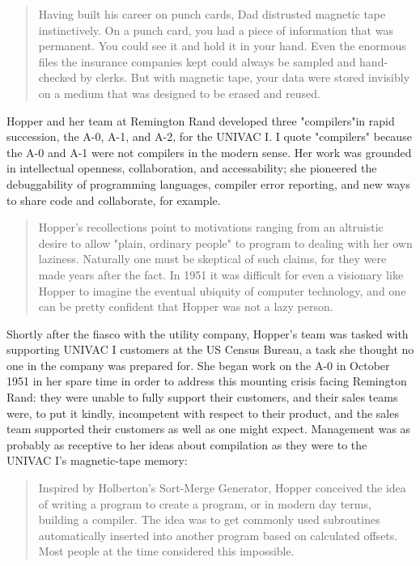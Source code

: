 \begin{quotation}
	Having built his career on punch cards, Dad distrusted magnetic
	tape instinctively. On a punch card, you had a piece of information that
	was permanent. You could see it and hold it in your hand. Even the enormous files
	the insurance companies kept could always be sampled and hand-checked
	by clerks. But with magnetic tape, your data were stored invisibly on a
	medium that was designed to be erased and
	reused.\cite{grace_hopper_and_the_invention_of_the_information_age_2009}
\end{quotation}
Hopper and her team at Remington Rand developed three "compilers"in rapid
succession, the A-0, A-1, and A-2, for the UNIVAC I. I quote "compilers" because
the A-0 and A-1 were not compilers in the modern sense. Her work was grounded in
intellectual openness, collaboration, and accessability; she pioneered the
debuggability of programming languages, compiler error reporting, and new ways
to share code and collaborate, for example.
\begin{quotation}
	Hopper's recollections point to motivations ranging from an altruistic
	desire to allow "plain, ordinary people" to program to dealing with her own
	laziness. Naturally one must be skeptical of such claims, for they were made
	years after the fact. In 1951 it was difficult for even a visionary like Hopper
	to imagine the eventual ubiquity of computer technology, and one can be pretty
	confident that Hopper was not a lazy person.
	\cite{grace_hopper_and_the_invention_of_the_information_age_2009}
\end{quotation}
Shortly after the fiasco with the utility company, Hopper's team was tasked
with supporting UNIVAC I customers at the US Census Bureau, a task she thought
no one in the company was prepared for. She began work on the A-0 in October
1951 in her spare time in order to address this mounting crisis facing
Remington Rand: they were unable to fully support their customers, and their
sales teams were, to put it kindly, incompetent with respect to their product,
and the sales team supported their customers as well as one might expect.
Management was as probably as receptive to her ideas about compilation as they
were to the UNIVAC I's magnetic-tape memory:

\begin{quotation}
	Inspired by Holberton's Sort-Merge Generator, Hopper conceived the
	idea of writing a
	program to create a program, or in modern day terms, building a compiler.
	The idea was to get commonly used subroutines automatically
	inserted into another program based on calculated offsets.
	Most people at the time considered this impossible.
	\cite{women_in_computing_history_2002}
\end{quotation}


